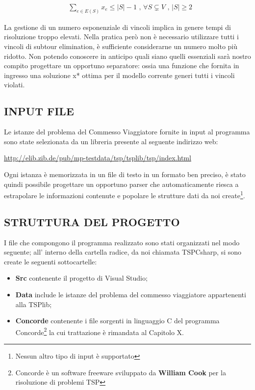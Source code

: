 \documentclass[11pt]{article}
\begin{document}
\begin{eqnarray}
&\displaystyle{\sum_{e \in E(S)}x_e \leq |S| - 1} \text{ , } \forall S \subsetneq V \text{ , } |S| \geq 2
\end{eqnarray}

La gestione di un numero esponenziale di vincoli implica in genere tempi di risoluzione troppo elevati. Nella pratica però non è necessario utilizzare tutti i vincoli di subtour elimination, è sufficiente considerarne un numero molto più ridotto. Non potendo conoscere in anticipo quali siano quelli essenziali sarà nostro compito progettare un opportuno separatore: ossia una funzione che fornita in ingresso una soluzione x* ottima per il modello corrente generi tutti i vincoli violati.

\subsection*{INPUT FILE}
\label{sec:InputFileS}

Le istanze del problema del Commesso Viaggiatore fornite in input al programma sono state selezionata da un libreria presente al seguente indirizzo web: 

\begin{center}
\href{http://elib.zib.de/pub/mp-testdata/tsp/tsplib/tsp/index.html}{http://elib.zib.de/pub/mp-testdata/tsp/tsplib/tsp/index.html}
\end{center}

Ogni istanza è memorizzata in un file di testo in un formato ben preciso, è stato quindi possibile progettare un opportuno parser che automaticamente riesca a estrapolare le informazioni contenute e popolare le strutture dati da noi create\footnote{Nessun altro tipo di input è supportato}.

\subsection*{STRUTTURA DEL PROGETTO}
\label{sec:StrutturaProgettoS}

I file che compongono il programma realizzato sono stati organizzati nel modo seguente; all' interno della cartella radice, da noi chiamata TSPCsharp, si sono create le seguenti sottocartelle:

\begin{itemize}
\item \textbf{Src} contenente il progetto di Visual Studio;
\item \textbf{Data} include le istanze del problema del commesso viaggiatore appartenenti alla TSPlib;
\item \textbf{Concorde} contenente i file sorgenti in linguaggio C del programma Concorde\footnote{Concorde è un software freeware sviluppato da \textbf{William Cook} per la risoluzione di problemi TSP} la cui trattazione è rimandata al Capitolo X.
\end{itemize}
\end{document}
